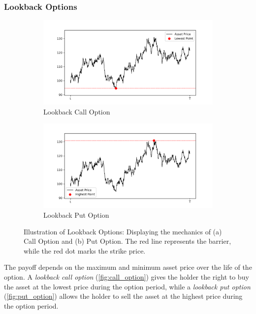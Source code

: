 \documentclass[a4paper]{report}
\begin{document}
\subsubsection{Lookback Options}\label{lookback}
\begin{figure}[H]
    \begin{subfigure}{.5\linewidth}
      \includegraphics[width=\linewidth]{images/call_option.png}
      \caption{Lookback Call Option}
      \label{fig:call_option}
    \end{subfigure}\hfill
    \begin{subfigure}{.5\linewidth}
      \includegraphics[width=\linewidth]{images/put_option.png}
      \caption{Lookback Put Option}
      \label{fig:put_option}
    \end{subfigure}
    \caption{Illustration of Lookback Options: Displaying the mechanics of (a) Call Option and (b) Put Option. The red line represents the barrier, while the red dot marks the strike price.}
\end{figure}

\noindent The payoff depends on the maximum and minimum asset price over the life of the option. A \textit{lookback call option} (\autoref{fig:call_option}) gives the holder the right to buy the asset at the lowest price during the option period, while a \textit{lookback put option} (\autoref{fig:put_option}) allows the holder to sell the asset at the highest price during the option period.
\end{document}
